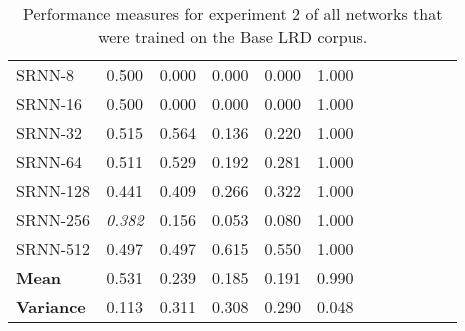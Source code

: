 \begin{table}[t]
\begin{tabularx}{\textwidth}{@{}l*{10}{C}c@{}}
   SRNN-8 &     0.500 &      0.000 &   0.000 &     0.000 &    1.000 \\
  SRNN-16 &     0.500 &      0.000 &   0.000 &     0.000 &    1.000 \\
  SRNN-32 &     0.515 &      0.564 &   0.136 &     0.220 &    1.000 \\
  SRNN-64 &     0.511 &      0.529 &   0.192 &     0.281 &    1.000 \\
 SRNN-128 &     0.441 &      0.409 &   0.266 &     0.322 &    1.000 \\
 SRNN-256 &     \textit{0.382} &      0.156 &   0.053 &     0.080 &    1.000 \\
 SRNN-512 &     0.497 &      0.497 &   0.615 &     0.550 &    1.000 \\
 \midrule
 \midrule
 \textbf{Mean} & 0.531 & 0.239 & 0.185 & 0.191 & 0.990 \\
 \textbf{Variance} & 0.113 & 0.311 & 0.308 & 0.290 & 0.048 \\
\bottomrule
\end{tabularx}
\caption[Base LRD trained network performance on experiment 2]{Performance measures for experiment 2 of all networks that were trained on the Base LRD corpus.}
\label{tab:perf_NDbase}
\end{table}
